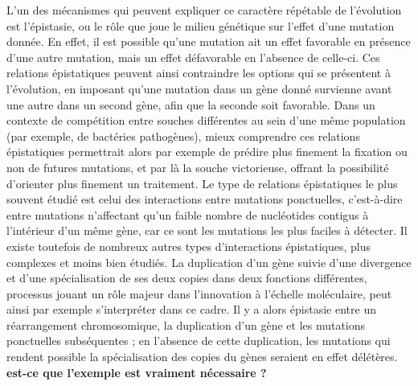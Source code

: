 L'un des mécanismes qui peuvent expliquer ce caractère répétable de l'évolution est l'épistasie, ou le rôle que joue le milieu génétique sur l'effet d'une mutation donnée.
En effet, il est possible qu'une mutation ait un effet favorable en présence d'une autre mutation, mais un effet défavorable en l'absence de celle-ci.
Ces relations épistatiques peuvent ainsi contraindre les options qui se présentent à l'évolution, en imposant qu'une mutation dans un gène donné survienne avant une autre dans un second gène, afin que la seconde soit favorable.
Dans un contexte de compétition entre souches différentes au sein d'une même population (par exemple, de bactéries pathogènes), mieux comprendre ces relations épistatiques permettrait alors par exemple de prédire plus finement la fixation ou non de futures mutations, et par là la souche victorieuse, offrant la possibilité d'orienter plus finement un traitement.
Le type de relations épistatiques le plus souvent étudié est celui des interactions entre mutations ponctuelles, c'est-à-dire entre mutations n'affectant qu'un faible nombre de nucléotides contigus à l'intérieur d'un même gène, car ce sont les mutations les plus faciles à détecter.
Il existe toutefois de nombreux autres types d'interactions épistatiques, plus complexes et moins bien étudiés.
La duplication d'un gène suivie d'une divergence et d'une spécialisation de ses deux copies dans deux fonctions différentes, processus jouant un rôle majeur dans l'innovation à l'échelle moléculaire, peut ainsi par exemple s'interpréter dans ce cadre.
Il y a alors épistasie entre un réarrangement chromosomique, la duplication d'un gène et les mutations ponctuelles subséquentes ; en l'absence de cette duplication, les mutations qui rendent possible la spécialisation des copies du gènes seraient en effet délétères. \textbf{est-ce que l'exemple est vraiment nécessaire ?}

